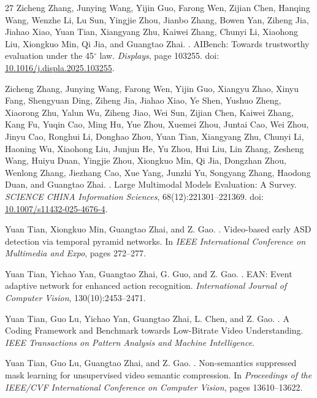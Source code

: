 \documentclass[10pt,twocolumn]{article}
\begin{document}
\begin{thebibliography}{27}
Zicheng Zhang, Junying Wang, Yijin Guo, Farong Wen, Zijian Chen, Hanqing Wang, Wenzhe Li, Lu Sun, Yingjie Zhou, Jianbo Zhang, Bowen Yan, Ziheng Jia, Jiahao Xiao, Yuan Tian, Xiangyang Zhu, Kaiwei Zhang, Chunyi Li, Xiaohong Liu, Xiongkuo Min, Qi Jia, and Guangtao Zhai.
.
\newblock AIBench: Towards trustworthy evaluation under the 45$^\circ$ law.
\newblock \emph{Displays}, page 103255.
\newblock doi: \href{https://doi.org/10.1016/j.displa.2025.103255}{10.1016/j.displa.2025.103255}.

Zicheng Zhang, Junying Wang, Farong Wen, Yijin Guo, Xiangyu Zhao, Xinyu Fang, Shengyuan Ding, Ziheng Jia, Jiahao Xiao, Ye Shen, Yushuo Zheng, Xiaorong Zhu, Yalun Wu, Ziheng Jiao, Wei Sun, Zijian Chen, Kaiwei Zhang, Kang Fu, Yuqin Cao, Ming Hu, Yue Zhou, Xuemei Zhou, Juntai Cao, Wei Zhou, Jinyu Cao, Ronghui Li, Donghao Zhou, Yuan Tian, Xiangyang Zhu, Chunyi Li, Haoning Wu, Xiaohong Liu, Junjun He, Yu Zhou, Hui Liu, Lin Zhang, Zesheng Wang, Huiyu Duan, Yingjie Zhou, Xiongkuo Min, Qi Jia, Dongzhan Zhou, Wenlong Zhang, Jiezhang Cao, Xue Yang, Junzhi Yu, Songyang Zhang, Haodong Duan, and Guangtao Zhai.
.
\newblock Large Multimodal Models Evaluation: A Survey.
\newblock \emph{SCIENCE CHINA Information Sciences}, 68(12):221301--221369.
\newblock doi: \href{https://doi.org/10.1007/s11432-025-4676-4}{10.1007/s11432-025-4676-4}.

Yuan Tian, Xiongkuo Min, Guangtao Zhai, and Z. Gao.
.
\newblock Video-based early ASD detection via temporal pyramid networks.
\newblock In \emph{IEEE International Conference on Multimedia and Expo}, pages 272--277.

Yuan Tian, Yichao Yan, Guangtao Zhai, G. Guo, and Z. Gao.
.
\newblock EAN: Event adaptive network for enhanced action recognition.
\newblock \emph{International Journal of Computer Vision}, 130(10):2453--2471.

Yuan Tian, Guo Lu, Yichao Yan, Guangtao Zhai, L. Chen, and Z. Gao.
.
\newblock A Coding Framework and Benchmark towards Low-Bitrate Video Understanding.
\newblock \emph{IEEE Transactions on Pattern Analysis and Machine Intelligence}.

Yuan Tian, Guo Lu, Guangtao Zhai, and Z. Gao.
.
\newblock Non-semantics suppressed mask learning for unsupervised video semantic compression.
\newblock In \emph{Proceedings of the IEEE/CVF International Conference on Computer Vision}, pages 13610--13622.


\end{thebibliography}
\end{document}
